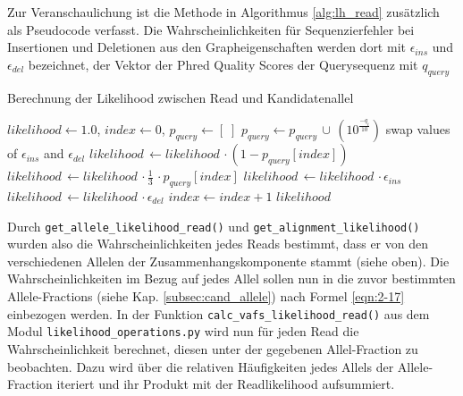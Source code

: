 Zur Veranschaulichung ist die Methode in Algorithmus \ref{alg:lh_read} zusätzlich als Pseudocode verfasst. Die Wahrscheinlichkeiten für Sequenzierfehler bei Insertionen und Deletionen aus den Grapheigenschaften werden dort mit $ \epsilon_{ins} $ und $ \epsilon_{del} $ bezeichnet, der Vektor der Phred Quality Scores der Querysequenz mit $q_{query}$
\newpage
\begin{algorithm}[H]
	\caption{Berechnung der Likelihood zwischen Read und Kandidatenallel}  \label{alg:lh_read}
	\begin{algorithmic}[1]	
		\State $ likelihood \gets 1.0 $, $ index \gets 0 $, $ p_{query} \gets [\;] $
		\State $p_{query} \gets p_{query}\, \cup \, (10^{\frac{-q_{i}}{10}}) $
		\EndFor			
		\State swap values of $ \epsilon_{ins} $ and $ \epsilon_{del} $
		\EndIf
		\State $ likelihood\, \gets likelihood \,\cdotp (1-p_{query}[index]) $
		\EndIf
		\State $ likelihood\, \gets likelihood \,\cdotp \frac{1}{3} \,\cdotp p_{query}[index] $
		\EndIf
		\State $ likelihood\, \gets likelihood \,\cdotp \epsilon_{ins}$
		\EndIf
		\State $ likelihood\, \gets likelihood \,\cdotp \epsilon_{del} $
		\EndIf
		\State $index \gets index + 1 $
		\EndWhile
		\EndFor
		\State \Return $likelihood$
		\EndFunction		
	\end{algorithmic}
\end{algorithm}

Durch \lstinline|get_allele_likelihood_read()| und \lstinline|get_alignment_likelihood()| wurden also die Wahrscheinlichkeiten jedes Reads bestimmt, dass er von den verschiedenen Allelen der Zusammenhangskomponente stammt (siehe oben). Die Wahrscheinlichkeiten im Bezug auf jedes Allel sollen nun in die zuvor bestimmten Allele-Fractions (siehe Kap. \ref{subsec:cand_allele}) nach Formel \eqref{eqn:2-17} einbezogen werden. In der Funktion \lstinline|calc_vafs_likelihood_read()| aus dem Modul \lstinline|likelihood_operations.py| wird nun für jeden Read die Wahrscheinlichkeit berechnet, diesen unter der gegebenen Allel-Fraction zu beobachten. Dazu wird über die relativen Häufigkeiten jedes Allels der Allele-Fraction iteriert und ihr Produkt mit der Readlikelihood aufsummiert. \\

